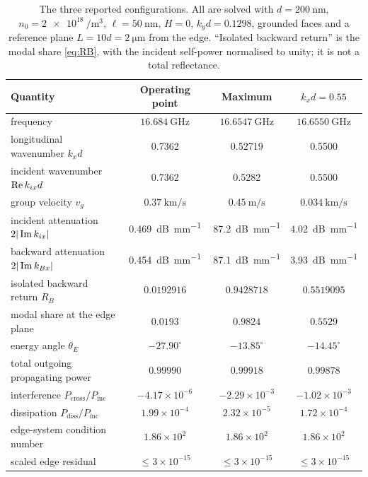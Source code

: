 \begin{table}[t]
\centering
\caption{The three reported configurations.  All are solved with
$d=\SI{200}{\nano\metre}$, $n_0=\SI{2e18}{\per\cubic\metre}$,
$\ell=\SI{50}{\nano\metre}$, $H=0$, $k_yd=0.1298$, grounded faces and a
reference plane $L=10d=\SI{2}{\micro\metre}$ from the edge.  ``Isolated
backward return'' is the modal share \eqref{eq:RB}, with the incident
self-power normalised to unity; it is not a total reflectance.}
\label{tab:configurations}
\small
\begin{tabular}{@{}lccc@{}}
\toprule
Quantity & Operating point & Maximum & $k_xd=0.55$ \\
\midrule
frequency & $\SI{16.684}{\giga\hertz}$ & $\SI{16.6547}{\giga\hertz}$ & $\SI{16.6550}{\giga\hertz}$ \\
longitudinal wavenumber $k_xd$ & 0.7362 & 0.52719 & 0.5500 \\
incident wavenumber $\operatorname{Re} k_{ix}d$ & 0.7362 & 0.5282 & 0.5500 \\
group velocity $v_g$ & $\SI{0.37}{\kilo\metre\per\second}$ & $\SI{0.45}{\metre\per\second}$ & $\SI{0.034}{\kilo\metre\per\second}$ \\
incident attenuation $2|\operatorname{Im} k_{ix}|$ & \SI{0.469}{\deci\bel\per\milli\metre} & \SI{87.2}{\deci\bel\per\milli\metre} & \SI{4.02}{\deci\bel\per\milli\metre} \\
backward attenuation $2|\operatorname{Im} k_{Bx}|$ & \SI{0.454}{\deci\bel\per\milli\metre} & \SI{87.1}{\deci\bel\per\milli\metre} & \SI{3.93}{\deci\bel\per\milli\metre} \\
isolated backward return $R_B$ & $0.0192916$ & $0.9428718$ & $0.5519095$ \\
modal share at the edge plane & $0.0193$ & $0.9824$ & $0.5529$ \\
energy angle $\theta_E$ & $-27.90^{\circ}$ & $-13.85^{\circ}$ & $-14.45^{\circ}$ \\
total outgoing propagating power & $0.99990$ & $0.99918$ & $0.99878$ \\
interference $P_{\text{cross}}/P_{\text{inc}}$ & $-4.17\times10^{-6}$ & $-2.29\times10^{-3}$ & $-1.02\times10^{-3}$ \\
dissipation $P_{\text{diss}}/P_{\text{inc}}$ & $1.99\times10^{-4}$ & $2.32\times10^{-5}$ & $1.72\times10^{-4}$ \\
edge-system condition number & $1.86\times10^{2}$ & $1.86\times10^{2}$ & $1.86\times10^{2}$ \\
scaled edge residual & $\le3\times10^{-15}$ & $\le3\times10^{-15}$ & $\le3\times10^{-15}$ \\
\bottomrule
\end{tabular}
\end{table}


